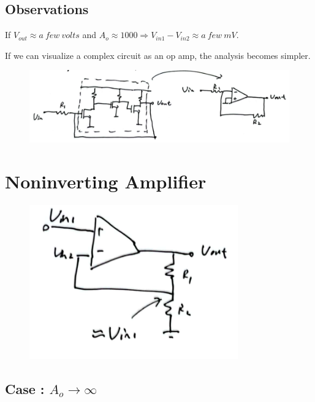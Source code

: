 \documentclass[fontset=windows]{article}
\begin{document}
\subsection*{Observations}

If $V_{out}\approx a\ few\ volts$ and $A_o\approx1000\Longrightarrow V_{in1}-V_{in2}\approx a\ few\ mV$. 

If we can visualize a complex circuit as an op amp, the analysis becomes simpler. 

\begin{figure}[htbp]
    \centering
    \includegraphics[scale=0.8]{3.jpg}
    \captionsetup{labelformat=empty}
    \caption{}
    \label{3}
\end{figure}

\section*{Noninverting Amplifier}

\begin{figure}[htbp]
    \centering
    \includegraphics[scale=0.8]{4.jpg}
    \captionsetup{labelformat=empty}
    \caption{}
    \label{4}
\end{figure}

\subsection*{Case \uppercase\expandafter{}: $A_o\to \infty$}
\end{document}
